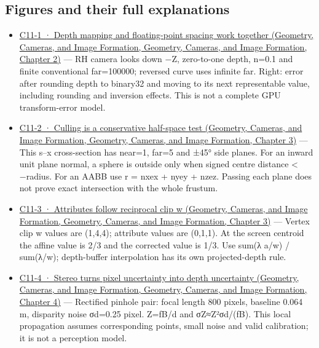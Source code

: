 \subsection{Figures and their full explanations}\label{appendix-a2b71a18f5a2-figures-and-their-full-explanations}

\begin{itemize}
\item
  \href{../03-Geometry-Cameras-and-Image-Formation/main.pdf\#nameddest=02-foundations-ii-ch033-figure-c11-1-depth-mapping-and-floating-point-spacing-work-together}{C11-1 · Depth mapping and floating-point spacing work together (Geometry, Cameras, and Image Formation, Geometry, Cameras, and Image Formation, Chapter 2)} --- RH camera looks down −Z, zero-to-one depth, n=0.1 and finite conventional far=100000; reversed curve uses infinite far. Right: error after rounding depth to binary32 and moving to its next representable value, including rounding and inversion effects. This is not a complete GPU transform-error model.
\item
  \href{../03-Geometry-Cameras-and-Image-Formation/main.pdf\#nameddest=02-foundations-ii-ch034-figure-c11-2-culling-is-a-conservative-half-space-test}{C11-2 · Culling is a conservative half-space test (Geometry, Cameras, and Image Formation, Geometry, Cameras, and Image Formation, Chapter 3)} --- This s--x cross-section has near=1, far=5 and ±45° side planes. For an inward unit plane normal, a sphere is outside only when signed centre distance \textless{} −radius. For an AABB use r = \textbar nx\textbar ex + \textbar ny\textbar ey + \textbar nz\textbar ez. Passing each plane does not prove exact intersection with the whole frustum.
\item
  \href{../03-Geometry-Cameras-and-Image-Formation/main.pdf\#nameddest=02-foundations-ii-ch034-figure-c11-3-attributes-follow-reciprocal-clip-w}{C11-3 · Attributes follow reciprocal clip w (Geometry, Cameras, and Image Formation, Geometry, Cameras, and Image Formation, Chapter 3)} --- Vertex clip w values are (1,4,4); attribute values are (0,1,1). At the screen centroid the affine value is 2/3 and the corrected value is 1/3. Use sum(λ a/w) / sum(λ/w); depth-buffer interpolation has its own projected-depth rule.
\item
  \href{../03-Geometry-Cameras-and-Image-Formation/main.pdf\#nameddest=02-foundations-ii-ch035-figure-c11-4-stereo-turns-pixel-uncertainty-into-depth-uncertainty}{C11-4 · Stereo turns pixel uncertainty into depth uncertainty (Geometry, Cameras, and Image Formation, Geometry, Cameras, and Image Formation, Chapter 4)} --- Rectified pinhole pair: focal length 800 pixels, baseline 0.064 m, disparity noise σd=0.25 pixel. Z=fB/d and σZ≈Z²σd/(fB). This local propagation assumes corresponding points, small noise and valid calibration; it is not a perception model.

\end{itemize}
